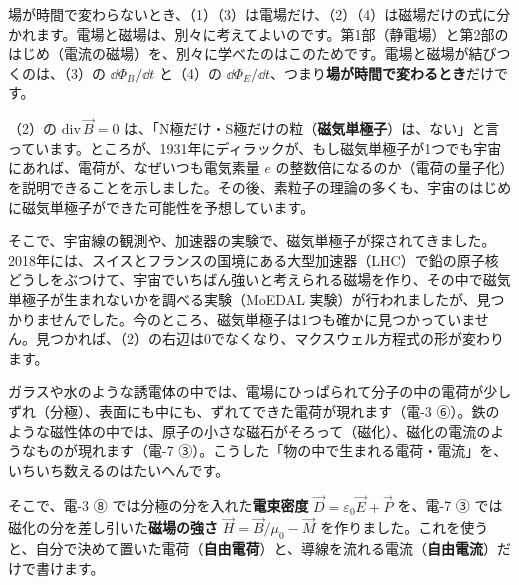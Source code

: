 場が時間で変わらないとき、（1）（3）は電場だけ、（2）（4）は磁場だけの式に分かれます。電場と磁場は、別々に考えてよいのです。第1部（静電場）と第2部のはじめ（電流の磁場）を、別々に学べたのはこのためです。電場と磁場が結びつくのは、（3）の $\dd\Phi_B/\dd t$ と（4）の $\dd\Phi_E/\dd t$、つまり\textbf{場が時間で変わるとき}だけです。

\begin{phmada}
（2）の $\mathrm{div}\,\vec B=0$ は、「N極だけ・S極だけの粒（\textbf{磁気単極子}）は、ない」と言っています。ところが、1931年にディラックが、もし磁気単極子が1つでも宇宙にあれば、電荷が、なぜいつも電気素量 $e$ の整数倍になるのか（電荷の量子化）を説明できることを示しました。その後、素粒子の理論の多くも、宇宙のはじめに磁気単極子ができた可能性を予想しています。

そこで、宇宙線の観測や、加速器の実験で、磁気単極子が探されてきました。2018年には、スイスとフランスの国境にある大型加速器（LHC）で鉛の原子核どうしをぶつけて、宇宙でいちばん強いと考えられる磁場を作り、その中で磁気単極子が生まれないかを調べる実験（MoEDAL 実験）が行われましたが、見つかりませんでした。今のところ、磁気単極子は1つも確かに見つかっていません。見つかれば、（2）の右辺は0でなくなり、マクスウェル方程式の形が変わります。
\end{phmada}


\leavevmode\label{ph:電-14:sec6}ガラスや水のような誘電体の中では、電場にひっぱられて分子の中の電荷が少しずれ（分極）、表面にも中にも、ずれてできた電荷が現れます（電-3 ⑥）。鉄のような磁性体の中では、原子の小さな磁石がそろって（磁化）、磁化の電流のようなものが現れます（電-7 ③）。こうした「物の中で生まれる電荷・電流」を、いちいち数えるのはたいへんです。

そこで、電-3 ⑧ では分極の分を入れた\textbf{電束密度} $\vec D=\varepsilon_0\vec E+\vec P$ を、電-7 ③ では磁化の分を差し引いた\textbf{磁場の強さ} $\vec H=\vec B/\mu_0-\vec M$ を作りました。これを使うと、自分で決めて置いた電荷（\textbf{自由電荷}）と、導線を流れる電流（\textbf{自由電流}）だけで書けます。

